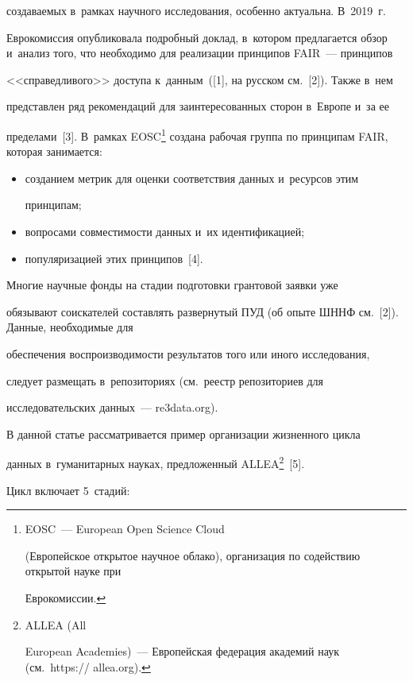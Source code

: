 создаваемых в~рамках научного исследования, особенно актуальна. В~2019~г.\ 

Еврокомиссия опубликовала подробный доклад, в~котором предлагается обзор и~анализ того, что необходимо для реализации принципов FAIR~--- принципов 

<<справедливого>> доступа к~данным~([1], на русском см.~[2]). Также в~нем 

представлен ряд рекомендаций для заинтересованных сторон в~Европе и~за ее 

пределами~[3]. В~рамках EOSC\footnote[3]{EOSC~--- European Open Science Cloud 

(Европейское открытое научное облако), организация по содействию открытой науке при 

Еврокомиссии.} создана рабочая группа по принципам FAIR, которая занимается:

  \begin{itemize}

  \item созданием метрик для оценки соответствия данных и~ресурсов этим 

принципам;

  \item вопросами совместимости данных и~их идентификацией;

  \item  популяризацией этих принципов~[4]. 

  \end{itemize}

  

  Многие научные фонды на стадии подготовки грантовой заявки уже 

обязывают соискателей составлять развернутый  ПУД (об опыте ШННФ см.~[2]). Данные, необходимые для 

обеспечения воспроизводимости результатов того или иного исследования, 

следует размещать в~репозиториях (см.\ реестр репозиториев для 

исследовательских данных~--- {\sf re3data.org}).

  

  В данной статье рассматривается пример организации жизненного цикла 

данных в~гуманитарных науках, предложенный ALLEA\footnote{ALLEA (All 

European Academies)~--- Европейская федерация академий наук (см.\ {\sf https:// allea.org}).}~[5]. 

Цикл включает 5~стадий: 

